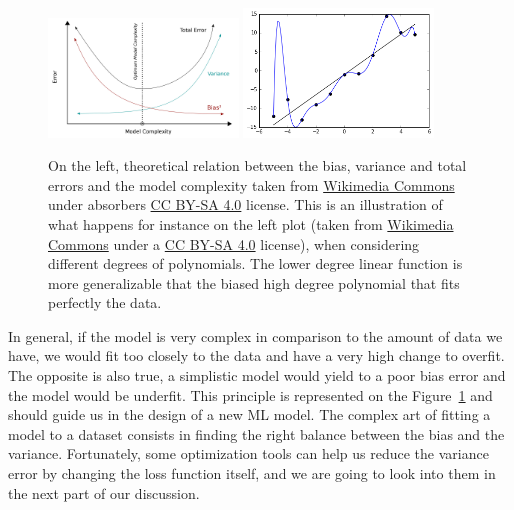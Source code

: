 \documentclass[main]{subfiles}
\begin{document}
\begin{figure}[ht]
  \centering
    \includegraphics[width=0.45\textwidth]{figures/4-ml/Bias_and_variance_contributing_to_total_error.svg.png}
    \includegraphics[width=0.45\textwidth]{figures/4-ml/Overfitted_Data.png}
    \caption{On the left, theoretical relation between the bias, variance and total errors and the model complexity taken from \href{https://en.wikipedia.org/wiki/File:Bias_and_variance_contributing_to_total_error.svg}{Wikimedia Commons} under absorbers \href{https://creativecommons.org/licenses/by-sa/4.0}{CC BY-SA 4.0} license. This is an illustration of what happens for instance on the left plot (taken from \href{https://en.wikipedia.org/wiki/File:Overfitted_Data.png}{Wikimedia Commons} under a \href{https://creativecommons.org/licenses/by-sa/4.0}{CC BY-SA 4.0} license), when considering different degrees of polynomials. The lower degree linear function is more generalizable that the biased high degree polynomial that fits perfectly the data.}\label{fgr:bias_variance}
\end{figure}

In general, if the model is very complex in comparison to the amount of data we have, we would fit too closely to the data and have a very high change to overfit. The opposite is also true, a simplistic model would yield to a poor bias error and the model would be underfit. This principle is represented on the Figure~\ref{fgr:bias_variance} and should guide us in the design of a new ML model.
The complex art of fitting a model to a dataset consists in finding the right balance between the bias and the variance. Fortunately, some optimization tools can help us reduce the variance error by changing the loss function itself, and we are going to look into them in the next part of our discussion.
\end{document}
